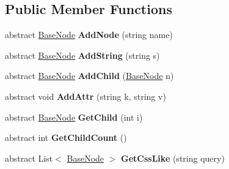 \subsection*{Public Member Functions}
\begin{DoxyCompactItemize}
\item 
\hypertarget{class_x_m_leru_handleru_1_1_base_node_a6fcb5194ad2113e93bc45c17d728a07a}{}abstract \hyperlink{class_x_m_leru_handleru_1_1_base_node}{Base\+Node} {\bfseries Add\+Node} (string name)\label{class_x_m_leru_handleru_1_1_base_node_a6fcb5194ad2113e93bc45c17d728a07a}

\item 
\hypertarget{class_x_m_leru_handleru_1_1_base_node_a0f28227f706da1e001e48d281513fce4}{}abstract \hyperlink{class_x_m_leru_handleru_1_1_base_node}{Base\+Node} {\bfseries Add\+String} (string s)\label{class_x_m_leru_handleru_1_1_base_node_a0f28227f706da1e001e48d281513fce4}

\item 
\hypertarget{class_x_m_leru_handleru_1_1_base_node_ad5d3ecd24e6f39daaa6010da7b457ef0}{}abstract \hyperlink{class_x_m_leru_handleru_1_1_base_node}{Base\+Node} {\bfseries Add\+Child} (\hyperlink{class_x_m_leru_handleru_1_1_base_node}{Base\+Node} n)\label{class_x_m_leru_handleru_1_1_base_node_ad5d3ecd24e6f39daaa6010da7b457ef0}

\item 
\hypertarget{class_x_m_leru_handleru_1_1_base_node_a6281b4132c69263e42f79f48d83f0ee0}{}abstract void {\bfseries Add\+Attr} (string k, string v)\label{class_x_m_leru_handleru_1_1_base_node_a6281b4132c69263e42f79f48d83f0ee0}

\item 
\hypertarget{class_x_m_leru_handleru_1_1_base_node_ab3370786a72aea288391e5975f55ce4e}{}abstract \hyperlink{class_x_m_leru_handleru_1_1_base_node}{Base\+Node} {\bfseries Get\+Child} (int i)\label{class_x_m_leru_handleru_1_1_base_node_ab3370786a72aea288391e5975f55ce4e}

\item 
\hypertarget{class_x_m_leru_handleru_1_1_base_node_acd7c21e09ca9c074c0e17036e8bf7c67}{}abstract int {\bfseries Get\+Child\+Count} ()\label{class_x_m_leru_handleru_1_1_base_node_acd7c21e09ca9c074c0e17036e8bf7c67}

\item 
\hypertarget{class_x_m_leru_handleru_1_1_base_node_a479e738c0d51104fee57a025649aa69f}{}abstract List$<$ \hyperlink{class_x_m_leru_handleru_1_1_base_node}{Base\+Node} $>$ {\bfseries Get\+Css\+Like} (string query)\label{class_x_m_leru_handleru_1_1_base_node_a479e738c0d51104fee57a025649aa69f}


\end{DoxyCompactItemize}
